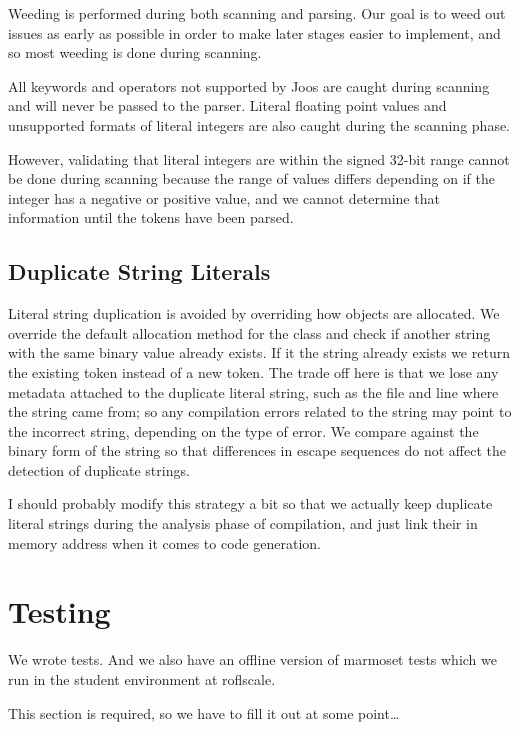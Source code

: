 \documentclass[pdftex,11pt,a4paper]{article}
\begin{document}
Weeding is performed during both scanning and parsing. Our goal is to
weed out issues as early as possible in order to make later stages
easier to implement, and so most weeding is done during scanning.

All keywords and operators not supported by Joos are caught during
scanning and will never be passed to the parser. Literal floating
point values and unsupported formats of literal integers are also
caught during the scanning phase.

However, validating that literal integers are within the signed 32-bit
range cannot be done during scanning because the range of values
differs depending on if the integer has a negative or positive value,
and we cannot determine that information until the tokens have been
parsed.


\subsection{Duplicate String Literals}

Literal string duplication is avoided by overriding how
 objects are allocated. We override the
default allocation method for the class and check if another string
with the same binary value already exists. If it the string already
exists we return the existing token instead of a new token. The trade
off here is that we lose any metadata attached to the duplicate
literal string, such as the file and line where the string came from;
so any compilation errors related to the string may point to the
incorrect string, depending on the type of error. We compare against
the binary form of the string so that differences in escape sequences
do not affect the detection of duplicate strings.

I should probably modify this strategy a bit so that we actually keep
duplicate literal strings during the analysis phase of compilation,
and just link their in memory address when it comes to code
generation.


\section{Testing}

We wrote tests. And we also have an offline version of marmoset tests
which we run in the student environment at roflscale.

This section is required, so we have to fill it out at some point\ldots
\end{document}
